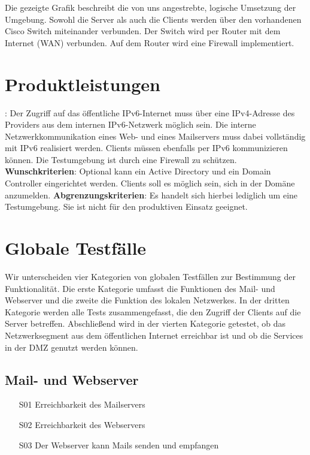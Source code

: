 Die gezeigte Grafik beschreibt die von uns angestrebte, logische Umsetzung der Umgebung. Sowohl die Server als auch die Clients werden über den vorhandenen Cisco Switch miteinander verbunden. Der Switch wird per Router mit dem Internet (WAN) verbunden. Auf dem Router wird eine Firewall implementiert.







\section{Produktleistungen}

: Der Zugriff auf das öffentliche IPv6-Internet muss über eine IPv4-Adresse des Providers aus dem internen IPv6-Netzwerk möglich sein. Die interne Netzwerkkommunikation eines Web- und eines Mailservers muss dabei vollständig mit IPv6 realisiert werden. Clients müssen ebenfalls per IPv6 kommunizieren können. Die Testumgebung ist durch eine Firewall zu schützen. {\bf Wunschkriterien}: Optional kann ein Active Directory und ein Domain Controller eingerichtet werden. Clients soll es möglich sein, sich in der Domäne anzumelden. {\bf Abgrenzungskriterien}: Es handelt sich hierbei lediglich um eine Testumgebung. Sie ist nicht für den produktiven Einsatz geeignet.\section{Globale Testfälle}

Wir unterscheiden vier Kategorien von globalen Testfällen zur Bestimmung der Funktionalität. Die erste Kategorie umfasst die Funktionen des Mail- und Webserver und die zweite die Funktion des lokalen Netzwerkes. In der dritten Kategorie werden alle Tests zusammengefasst, die den Zugriff der Clients auf die Server betreffen. Abschließend wird in der vierten Kategorie getestet, ob das Netzwerksegment aus dem öffentlichen Internet erreichbar ist und ob die Services in der DMZ genutzt werden können.

\subsection{Mail- und Webserver}
\begin{itemize}
	\item[S01] Erreichbarkeit des Mailservers
	\item[S02] Erreichbarkeit des Webservers
	\item[S03] Der Webserver kann Mails senden und empfangen
\end{itemize}
